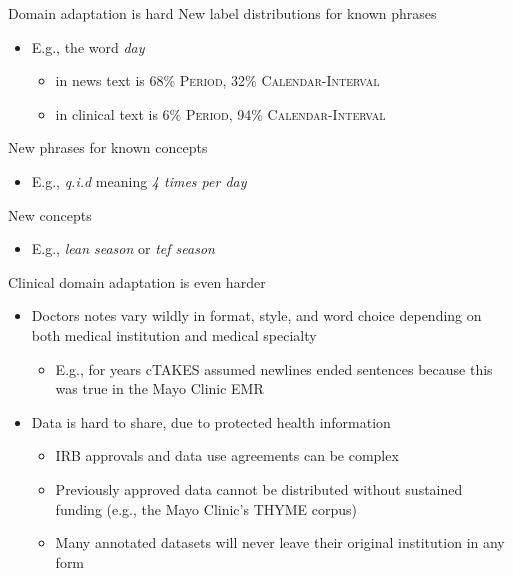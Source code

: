 \documentclass[14pt]{beamer}
\begin{document}
\begin{frame}{Domain adaptation is hard}
New label distributions for known phrases
\begin{itemize}
\item E.g., the word \textit{day}
\begin{itemize}
\item in news text is 68\% \textsc{Period}, 32\% \textsc{Calendar-Interval}
\item in clinical text is 6\% \textsc{Period}, 94\% \textsc{Calendar-Interval}
\end{itemize}
\end{itemize}

\pause
\bigskip
New phrases for known concepts
\begin{itemize}
\item E.g., \textit{q.i.d} meaning \textit{4 times per day}
\end{itemize}

\pause
\bigskip
New concepts
\begin{itemize}
\item E.g., \textit{lean season} or \textit{tef season}
\end{itemize}
\end{frame}

\begin{frame}{Clinical domain adaptation is even harder}
\begin{itemize}
\item Doctors notes vary wildly in format, style, and word choice depending on both medical institution and medical specialty
\begin{itemize}
\item E.g., for years cTAKES assumed newlines ended sentences because this was true in the Mayo Clinic EMR
\end{itemize}
\pause
\item Data is hard to share, due to protected health information
\begin{itemize}
\item IRB approvals and data use agreements can be complex
\item Previously approved data cannot be distributed without sustained funding (e.g., the Mayo Clinic's THYME corpus)
\item Many annotated datasets will never leave their original institution in any form
\end{itemize}
\end{itemize}
\end{frame}
\end{document}
